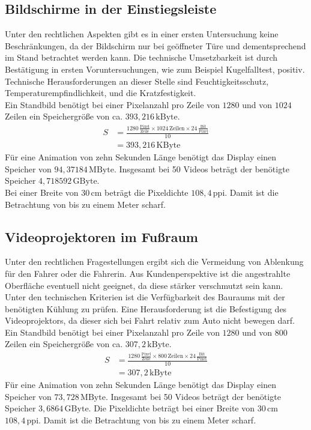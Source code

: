 \subsection{Bildschirme in der Einstiegsleiste}
Unter den rechtlichen Aspekten gibt es in einer ersten Untersuchung keine Beschränkungen, da der Bildschirm nur bei geöffneter Türe und dementsprechend im Stand betrachtet werden kann.
Die technische Umsetzbarkeit ist durch Bestätigung in ersten Voruntersuchungen, wie zum Beispiel Kugelfalltest, positiv. Technische Herausforderungen an dieser Stelle sind Feuchtigkeitsschutz, Temperaturempfindlichkeit, und die Kratzfestigkeit. \\
Ein Standbild benötigt bei einer Pixelanzahl pro Zeile von $ 1280 $ und von $ 1024 $ Zeilen ein Speichergröße von ca. $ 393,216\,\mathrm{kByte}$. 
\begin{align}
	S &= \frac{1280\,\frac{\mathrm{Pixel}}{\mathrm{Zeile}}\times 1024\,\mathrm{Zeilen} \times 24\,\frac{\mathrm{Bit}}{\mathrm{Pixel}}}{10} \\
	&= 393,216\,\mathrm{KByte}
\end{align}
Für eine Animation von zehn Sekunden Länge benötigt das Display einen Speicher von $ 94,37184\,\mathrm{MByte}$.
Insgesamt bei 50 Videos beträgt der benötigte Speicher $ 4,718592\,\mathrm{GByte}$. \\
Bei einer Breite von $ 30\,\mathrm{cm} $ beträgt die Pixeldichte $ 108,4\,\mathrm{ppi} $. Damit ist die Betrachtung von bis zu einem Meter scharf.
\subsection{Videoprojektoren im Fußraum}
Unter den rechtlichen Fragestellungen ergibt sich die Vermeidung von Ablenkung für den Fahrer oder die Fahrerin.
Aus Kundenperspektive ist die angestrahlte Oberfläche eventuell nicht geeignet, da diese stärker verschmutzt sein kann. \\
Unter den technischen Kriterien ist die Verfügbarkeit des Bauraums mit der benötigten Kühlung zu prüfen. Eine Herausforderung ist die Befestigung des Videoprojektors, da dieser sich bei Fahrt relativ zum Auto nicht bewegen darf. 
Ein Standbild benötigt bei einer Pixelanzahl pro Zeile von $ 1280 $ und von $ 800 $ Zeilen ein Speichergröße von ca. $ 307,2\,\mathrm{kByte}$. 
\begin{align}
	S &= \frac{1280\,\frac{\mathrm{Pixel}}{\mathrm{Zeile}}\times 800\,\mathrm{Zeilen} \times 24\,\frac{\mathrm{Bit}}{\mathrm{Pixel}}}{10} \\
	&= 307,2\,\mathrm{kByte}
\end{align}
Für eine Animation von zehn Sekunden Länge benötigt das Display einen Speicher von $ 73,728\,\mathrm{MByte}$.
Insgesamt bei 50 Videos beträgt der benötigte Speicher $ 3,6864\,\mathrm{GByte}$.
Die Pixeldichte beträgt bei einer Breite von $ 30\,\mathrm{cm} $ $ 108,4\,\mathrm{ppi} $. Damit ist die Betrachtung von bis zu einem Meter scharf.
